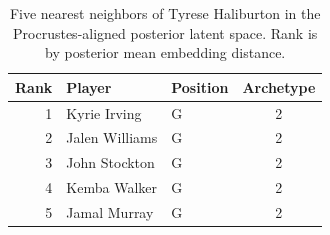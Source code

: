 \begin{table}[htbp]
  \centering\small
  \begin{tabular}{rllc}
    \toprule
    Rank & Player & Position & Archetype \\
    \midrule
    1 & Kyrie Irving & G & 2 \\
    2 & Jalen Williams & G & 2 \\
    3 & John Stockton & G & 2 \\
    4 & Kemba Walker & G & 2 \\
    5 & Jamal Murray & G & 2 \\
    \bottomrule
  \end{tabular}
  \caption{Five nearest neighbors of Tyrese Haliburton in the Procrustes-aligned posterior latent space. Rank is by posterior mean embedding distance.}
  \label{tab:Tyrese_Haliburton_neighbors}
\end{table}


